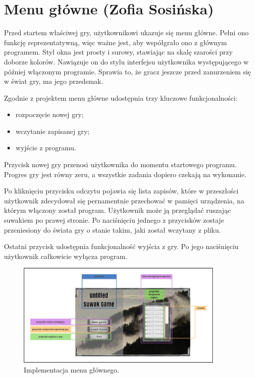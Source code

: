 \section{Menu główne (Zofia Sosińska)}\label{chap:menu_main}
Przed startem właściwej gry, użytkownikowi ukazuje się menu główne. Pełni ono funkcję reprezentatywną, więc ważne jest, aby współgrało ono z głównym programem.
Styl okna jest prosty i surowy, stawiając na skalę szarości przy doborze kolorów. Nawiązuje on do stylu interfejsu użytkownika występującego 
w później włączonym programie. Sprawia to, że gracz jeszcze przed zanurzeniem się w świat gry, ma jego przedsmak.

Zgodnie z projektem menu główne udostępnia trzy kluczowe funkcjonalności:
\begin{itemize}
    \item rozpoczęcie nowej gry;
    \item wczytanie zapisanej gry;
    \item wyjście z programu.
\end{itemize}

Przycisk nowej gry przenosi użytkownika do momentu startowego programu. Progres gry jest równy zeru, a wszystkie zadania dopiero czekają na wykonanie.

Po kliknięciu przycisku odczytu pojawia się lista zapisów, które w przeszłości użytkownik zdecydował się pernamentnie przechować w pamięci urządzenia, na którym
włączony został program. Użytkownik może ją przeglądać ruszając suwakiem po prawej stronie. Po naciśnięciu jednego z przycisków zostaje przeniesiony 
do świata gry o stanie takim, jaki został wczytany z pliku.

Ostatni przycisk udostępnia funkcjonalność wyjścia z gry. Po jego naciśnięciu użytkownik całkowicie wyłącza program.
\begin{figure}[htbp]
    \centering
    \includegraphics[width=0.9\textwidth]{images/ui/main_menu.png}
    \caption{Implementacja menu głównego.
    }\label{fig:compass}
\end{figure}
